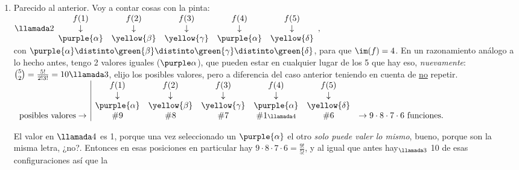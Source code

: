 \begin{enumerate}[label=\alph*)]
  \item Parecido al anterior. Voy a contar cosas con la pinta:
        $\llamada2
          \begin{array}{ccccc}
            f(1)            & f(2)           & f(3)            & f(4)            & f(5)            \\
            \downarrow      & \downarrow     & \downarrow      & \downarrow      & \downarrow      \\
            \purple{\alpha} & \yellow{\beta} & \yellow{\gamma} & \purple{\alpha} & \yellow{\delta}
          \end{array},
        $\\
        con $\purple{\alpha} \distinto \green{\beta} \distinto\green{\gamma} \distinto \green{\delta}$, para que $\im(f) = 4$.
        En un razonamiento análogo a lo hecho antes, tengo 2 valores iguales ($\purple\alpha$), que pueden estar en cualquier
        lugar de los 5 que hay eso, \textit{nuevamente}: $\binom{5}{2} = \frac{5!}{2!3!} = 10\llamada3$,
        elijo los posibles valores, pero a diferencia del caso anterior teniendo en cuenta de \underline{no} repetir.\\

        $\begin{array}{c|cccccc}
                                       & f(1)            & f(2)           & f(3)            & f(4)                       & f(5)            &                                            \\
                                       & \downarrow      & \downarrow     & \downarrow      & \downarrow                 & \downarrow      &                                            \\
                                       & \purple{\alpha} & \yellow{\beta} & \yellow{\gamma} & \purple{\alpha}            & \yellow{\delta} &                                            \\
            \text{posibles valores}\to & \#9             & \#8            & \#7             & \#1{\scriptstyle\llamada4} & \#6             & \to 9\cdot8\cdot7\cdot6 \text{ funciones}.
          \end{array}
        $

        El valor en $\llamada4$ es 1, porque una vez seleccionado un $\purple{\alpha}$ el otro \textit{solo puede valer lo mismo},
        bueno, porque son la misma letra, ¿no?. Entonces en esas posiciones en particular hay
        $9\cdot8\cdot 7\cdot6 = \frac{9!}{5!}$, y al igual que antes hay$_{\llamada3}$ 10 de esas configuraciones así que la
\end{enumerate}
